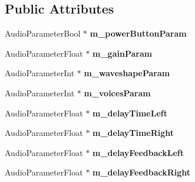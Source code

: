 \subsection*{Public Attributes}
\begin{DoxyCompactItemize}
\item 
Audio\+Parameter\+Bool $\ast$ {\bfseries m\+\_\+power\+Button\+Param}\hypertarget{class_synth_audio_processor_a1e7f0e2aaa30cdf50d5abe444f9b1ee4}{}\label{class_synth_audio_processor_a1e7f0e2aaa30cdf50d5abe444f9b1ee4}

\item 
Audio\+Parameter\+Float $\ast$ {\bfseries m\+\_\+gain\+Param}\hypertarget{class_synth_audio_processor_a54df7b789e2050a87956c2de38197bfc}{}\label{class_synth_audio_processor_a54df7b789e2050a87956c2de38197bfc}

\item 
Audio\+Parameter\+Int $\ast$ {\bfseries m\+\_\+waveshape\+Param}\hypertarget{class_synth_audio_processor_a7968568e4687502d4198362e7d6e77b9}{}\label{class_synth_audio_processor_a7968568e4687502d4198362e7d6e77b9}

\item 
Audio\+Parameter\+Int $\ast$ {\bfseries m\+\_\+voices\+Param}\hypertarget{class_synth_audio_processor_abd9217e35e339518a0fdb757b5e7c955}{}\label{class_synth_audio_processor_abd9217e35e339518a0fdb757b5e7c955}

\item 
Audio\+Parameter\+Float $\ast$ {\bfseries m\+\_\+delay\+Time\+Left}\hypertarget{class_synth_audio_processor_a97a8bb62a399eab090c49174deb02bb5}{}\label{class_synth_audio_processor_a97a8bb62a399eab090c49174deb02bb5}

\item 
Audio\+Parameter\+Float $\ast$ {\bfseries m\+\_\+delay\+Time\+Right}\hypertarget{class_synth_audio_processor_a2164eaffb07aeae27570a6f492c3fc59}{}\label{class_synth_audio_processor_a2164eaffb07aeae27570a6f492c3fc59}

\item 
Audio\+Parameter\+Float $\ast$ {\bfseries m\+\_\+delay\+Feedback\+Left}\hypertarget{class_synth_audio_processor_afc373ff07226f6afdea94611196c17e5}{}\label{class_synth_audio_processor_afc373ff07226f6afdea94611196c17e5}

\item 
Audio\+Parameter\+Float $\ast$ {\bfseries m\+\_\+delay\+Feedback\+Right}\hypertarget{class_synth_audio_processor_ace92806f78b3444c9638288e7d243376}{}\label{class_synth_audio_processor_ace92806f78b3444c9638288e7d243376}


\end{DoxyCompactItemize}

